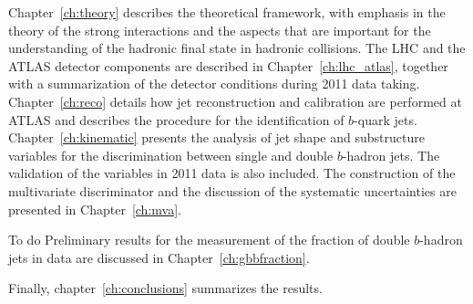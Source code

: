 Chapter~\ref{ch:theory} describes the theoretical framework, with emphasis in the theory of the strong interactions and the aspects that are important for the understanding of the hadronic final state in hadronic collisions. The LHC and the ATLAS detector components  are described in Chapter~\ref{ch:lhc_atlas}, together with a summarization of the detector conditions during 2011 data taking.  Chapter~\ref{ch:reco} details how jet reconstruction and calibration are performed at ATLAS and describes the procedure for the identification of $b$-quark jets. Chapter~\ref{ch:kinematic} presents the analysis of jet shape and substructure variables for the discrimination between single and double $b$-hadron jets. The validation of the variables in 2011 data is also included.   The construction of the multivariate discriminator  and the discussion of the systematic uncertainties are presented in Chapter~\ref{ch:mva}. 

{\sc To do}
Preliminary results for the measurement of the fraction of double $b$-hadron jets in data are discussed in Chapter~\ref{ch:gbbfraction}. 

Finally, chapter~\ref{ch:conclusions} summarizes the results. 

